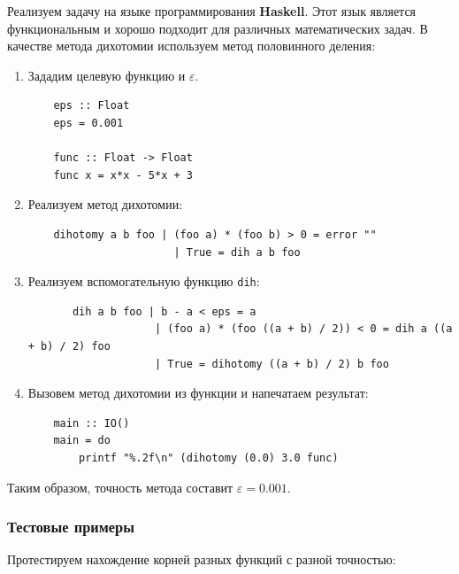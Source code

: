 \documentclass{article}
\begin{document}
				Реализуем задачу на языке программирования \textbf{Haskell}. Этот язык является функциональным и хорошо подходит для различных математических задач. В качестве метода дихотомии используем метод половинного деления:
				\begin{enumerate}
					\item Зададим целевую функцию и $\varepsilon$.			
					\lstset {language=Haskell}
					\begin{lstlisting}
    eps :: Float
    eps = 0.001
    
    func :: Float -> Float
    func x = x*x - 5*x + 3

					\end{lstlisting}
					
					\item Реализуем метод дихотомии:
					\begin{lstlisting}
    dihotomy a b foo | (foo a) * (foo b) > 0 = error ""
                       | True = dih a b foo
					\end{lstlisting}	
					
					\item Реализуем вспомогательную функцию \texttt{dih}:
					\begin{lstlisting}
       dih a b foo | b - a < eps = a
                    | (foo a) * (foo ((a + b) / 2)) < 0 = dih a ((a + b) / 2) foo
                    | True = dihotomy ((a + b) / 2) b foo
					\end{lstlisting}
					
					\item Вызовем метод дихотомии из функции и напечатаем результат:
					\begin{lstlisting}
    main :: IO()
    main = do
        printf "%.2f\n" (dihotomy (0.0) 3.0 func)
					\end{lstlisting}					
					
				
				\end{enumerate}
				
				Таким образом, точность метода составит $\varepsilon = 0.001$.
				
				\subsubsection{Тестовые примеры}
				
				Протестируем нахождение корней разных функций с разной точностью:\\
				
\end{document}
